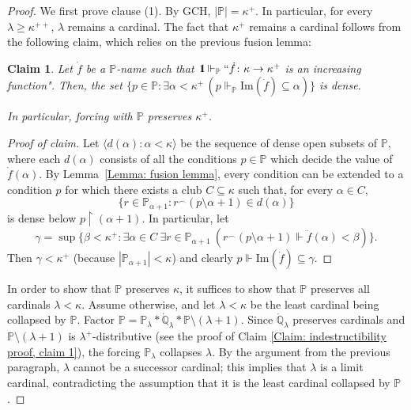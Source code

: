 \documentclass[11pt]{amsart}
\renewcommand{\restriction}{\mathbin\upharpoonright}    %
\newtheorem{claim}{Claim}[theorem]
\theoremstyle{definition}
\newcounter{condition}
\theoremstyle{remark}
\newcommand\<{{<}}
\newcommand{\one}{\mathop{1\hskip-3pt {\rm l}}}
\def\s{\subseteq}
\def\forces{\Vdash}
\newcommand{\po}{\mathbb{P}}
\newcommand{\qo}{\mathbb{Q}}
\begin{document}
\begin{proof}
    We first prove clause (1). By GCH, $|\po| = \kappa^+$. In particular, for every $\lambda\geq \kappa^{++}$, $\lambda$ remains a cardinal. The fact that $\kappa^+$ remains a cardinal follows from the following claim, which relies on the previous fusion lemma:
    \begin{claim}
      Let $\dot{f}$ be a $\mathbb{P}$-name such that $\one \forces_{\mathbb{P}} ``\dot{f}\colon\kappa\rightarrow \kappa^+$ is an increasing function".   Then, the set $\{p\in \mathbb{P}:  \exists \alpha<\kappa^+\,(p\forces_{\mathbb{P}}\mathrm{Im}(\dot{f})\s \alpha)\}$ is dense.

      In particular,    forcing with $\po$ preserves $\kappa^+$.
    \end{claim}
\begin{proof}[Proof of claim]
Let $\langle d(\alpha): \alpha<\kappa\rangle$  be the sequence of dense open subsets of $\po$, where each $d(\alpha)$ consists of all the conditions $p\in \mathbb{P}$ which decide the value of $\dot{f}(\alpha)$. By Lemma~\ref{Lemma: fusion lemma}, every condition can be extended to a condition $p$ for which there exists a club $C\subseteq \kappa$ such that, for every $\alpha\in C$,
    $$ \{  r\in \po_{\alpha+1} \colon r^{\frown} (p\setminus \alpha+1)\in d(\alpha)  \} $$
    is dense below $p\restriction (\alpha+1)$. In particular, let
    $$\gamma = \sup\{  \beta< \kappa^+ \colon  \exists \alpha\in C \ \exists r\in \po_{\alpha+1} \ \left( r^{\frown} (p\setminus \alpha+1)\Vdash \dot{f}(\alpha)< \beta \right) \}.$$
    Then $\gamma<\kappa^+$ (because $|\mathbb{P}_{\alpha+1}|<\kappa$) and clearly $p\Vdash \mathrm{Im}(\dot{f})\subseteq \gamma$.
\end{proof}

 
    
    In order to show that $\po$ preserves $\kappa$, it suffices to show that $\po$ preserves all cardinals $\lambda<\kappa$. Assume otherwise, and let $\lambda<\kappa$ be the least cardinal being collapsed by $\po$. Factor $\po = \po_{\lambda} * \dot{\qo}_{\lambda} * \po\setminus (\lambda+1)$. Since $\dot{\qo}_\lambda$ preserves cardinals and $\po\setminus (\lambda+1)$ is $\lambda^+$-distributive (see the proof of Claim \ref{Claim: indestructibility proof, claim 1}), the forcing $\po_\lambda$ collapses $\lambda$. By the argument from the previous paragraph, $\lambda$ cannot be a successor cardinal; this implies that $\lambda$ is a limit cardinal, contradicting the assumption that it is the least cardinal collapsed by $\po$.


\end{proof}
\end{document}
